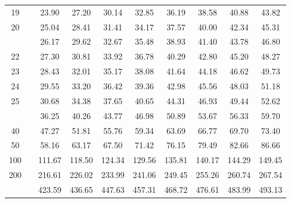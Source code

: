 \documentclass[
]{book}
\begin{document}
\begin{tabular}{cccccccccc}
19 &  & 23.90 & 27.20 & 30.14 & 32.85 & 36.19 & 38.58 & 40.88 & 43.82\\
20 &  & 25.04 & 28.41 & 31.41 & 34.17 & 37.57 & 40.00 & 42.34 & 45.31\\
\addlinespace
21 &  & 26.17 & 29.62 & 32.67 & 35.48 & 38.93 & 41.40 & 43.78 & 46.80\\
22 &  & 27.30 & 30.81 & 33.92 & 36.78 & 40.29 & 42.80 & 45.20 & 48.27\\
23 &  & 28.43 & 32.01 & 35.17 & 38.08 & 41.64 & 44.18 & 46.62 & 49.73\\
24 &  & 29.55 & 33.20 & 36.42 & 39.36 & 42.98 & 45.56 & 48.03 & 51.18\\
25 &  & 30.68 & 34.38 & 37.65 & 40.65 & 44.31 & 46.93 & 49.44 & 52.62\\
\addlinespace
30 &  & 36.25 & 40.26 & 43.77 & 46.98 & 50.89 & 53.67 & 56.33 & 59.70\\
40 &  & 47.27 & 51.81 & 55.76 & 59.34 & 63.69 & 66.77 & 69.70 & 73.40\\
50 &  & 58.16 & 63.17 & 67.50 & 71.42 & 76.15 & 79.49 & 82.66 & 86.66\\
100 &  & 111.67 & 118.50 & 124.34 & 129.56 & 135.81 & 140.17 & 144.29 & 149.45\\
200 &  & 216.61 & 226.02 & 233.99 & 241.06 & 249.45 & 255.26 & 260.74 & 267.54\\
\addlinespace
400 &  & 423.59 & 436.65 & 447.63 & 457.31 & 468.72 & 476.61 & 483.99 & 493.13\\
\bottomrule
\end{tabular}


\end{document}
